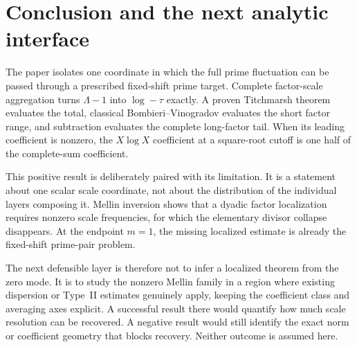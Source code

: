 \section{Conclusion and the next analytic interface}
\label{sec:conclusion}

The paper isolates one coordinate in which the full prime fluctuation can
be passed through a prescribed fixed-shift prime target.  Complete
factor-scale aggregation turns $\Lambda-1$ into $\log-\tau$ exactly.  A
proven Titchmarsh theorem evaluates the total, classical
Bombieri--Vinogradov evaluates the short factor range, and subtraction
evaluates the complete long-factor tail.  When its leading coefficient is
nonzero, the $X\log X$ coefficient at a square-root cutoff is one half of
the complete-sum coefficient.

This positive result is deliberately paired with its limitation.  It is a
statement about one scalar scale coordinate, not about the distribution of
the individual layers composing it.  Mellin inversion shows that a dyadic
factor localization requires nonzero scale frequencies, for which the
elementary divisor collapse disappears.  At the endpoint $m=1$, the
missing localized estimate is already the fixed-shift prime-pair problem.

The next defensible layer is therefore not to infer a localized theorem
from the zero mode.  It is to study the nonzero Mellin family in a region
where existing dispersion or Type~II estimates genuinely apply, keeping
the coefficient class and averaging axes explicit.  A successful result
there would quantify how much scale resolution can be recovered.  A
negative result would still identify the exact norm or coefficient
geometry that blocks recovery.  Neither outcome is assumed here.
